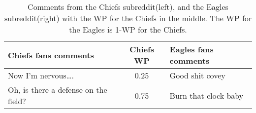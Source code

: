 \begin{table}[t]
    \centering
    \begin{tabular}{lcl}
        \toprule
        \textbf{Chiefs fans comments} & \textbf{Chiefs WP} & \textbf{Eagles fans comments} \\ \midrule
        Now I’m nervous…. & 0.25 & Good shit covey \\ \midrule
        Oh, is there a defense on the field? & 0.75 & Burn that clock baby \\ \bottomrule
    \end{tabular}
    \caption{Comments from the Chiefs subreddit(left), and the Eagles subreddit(right) with the WP for the Chiefs in the middle. The WP for the Eagles is 1-WP for the Chiefs.}
    \label{tab:football-exs}
\end{table}
